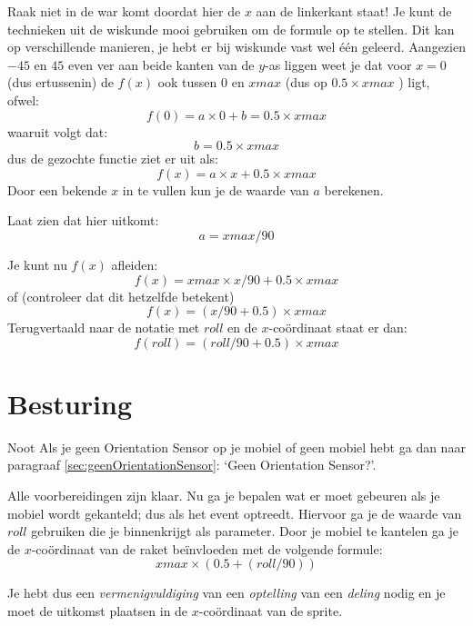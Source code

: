 Raak niet in de war komt doordat hier de $x$ aan de linkerkant staat! Je kunt de technieken uit de wiskunde mooi gebruiken om de formule op te stellen. Dit kan op verschillende manieren, je hebt er bij wiskunde vast wel \'e\'en geleerd. Aangezien $-45$ en $45$ even ver aan beide kanten van de $y$-as liggen weet je dat voor $x=0$ (dus ertussenin) de $f(x)$ ook tussen $0$ en $xmax$ (dus op $ 0.5 \times xmax $ ) ligt, ofwel:
\[
	f(0) = a \times 0 + b = 0.5 \times  xmax 
\]
waaruit volgt dat:
\[
	b = 0.5 \times xmax
\]
dus de gezochte functie ziet er uit als:
\[
	f(x) = a \times x + 0.5 \times xmax
\]
Door een bekende $x$ in te vullen kun je de waarde van $a$ berekenen. 

\begin{opgave}
   \opgVraag
	Laat zien dat hier uitkomt:
\[
	a=xmax/90
\]
\end{opgave}
Je kunt nu $f(x)$ afleiden:
\[
	f(x) = xmax \times x/90 + 0.5 \times xmax
\]
of (controleer dat dit hetzelfde betekent)
\[
	f(x) = (x/90 + 0.5)  \times  xmax
\]
Terugvertaald naar de notatie met $roll$ en de $x$-co\"ordinaat staat er dan:
\[
	f(roll) = (roll/90 + 0.5)  \times  xmax
\]

\section{Besturing}
\begin{derivation}{Noot}
  Als je geen Orientation Sensor op je mobiel of geen mobiel hebt ga dan naar paragraaf \ref{sec:geenOrientationSensor}: `Geen Orientation Sensor?'.
\end{derivation}

Alle voorbereidingen zijn klaar. Nu ga je bepalen wat er moet gebeuren als je mobiel wordt gekanteld; dus als het  event optreedt. Hiervoor ga je de waarde van $roll$ gebruiken die je binnenkrijgt als parameter. Door je mobiel te kantelen ga je de $x$-co\"ordinaat van de raket be\"invloeden met de volgende formule: 
\[
	xmax \times (0.5 + (roll/90))
\]

Je hebt dus een \emph{vermenigvuldiging} van een \emph{optelling} van een \emph{deling} nodig en je moet de uitkomst plaatsen in de $x$-co\"ordinaat van de sprite.

